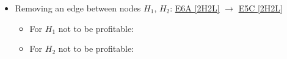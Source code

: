 \begin{itemize}
\begin{itemize}
	\end{itemize}

	\item Removing an edge between nodes $H_1$, $H_2$: \hyperref[apx:E6A:2H2L]{E6A [2H2L]} $\to$ \hyperref[apx:E5C:2H2L]{E5C [2H2L]}

	\begin{itemize}

		\item For $H_1$ not to be profitable:


		\item For $H_2$ not to be profitable:


	\end{itemize}

\end{itemize}



